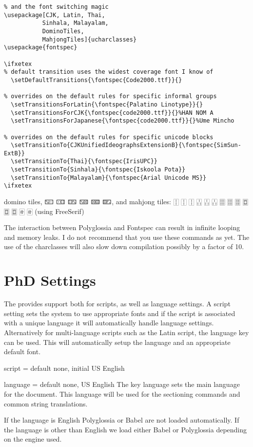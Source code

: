 \begin{verbatim}
% and the font switching magic
\usepackage[CJK, Latin, Thai, 
           Sinhala, Malayalam, 
           DominoTiles, 
           MahjongTiles]{ucharclasses}
\usepackage{fontspec}

\ifxetex
% default transition uses the widest coverage font I know of
  \setDefaultTransitions{\fontspec{Code2000.ttf}}{}

% overrides on the default rules for specific informal groups
  \setTransitionsForLatin{\fontspec{Palatino Linotype}}{}
  \setTransitionsForCJK{\fontspec{code2000.ttf}}{}%HAN NOM A
  \setTransitionsForJapanese{\fontspec{code2000.ttf}}{}%Ume Mincho

% overrides on the default rules for specific unicode blocks
  \setTransitionTo{CJKUnifiedIdeographsExtensionB}{\fontspec{SimSun-ExtB}}
  \setTransitionTo{Thai}{\fontspec{IrisUPC}}
  \setTransitionTo{Sinhala}{\fontspec{Iskoola Pota}}
  \setTransitionTo{Malayalam}{\fontspec{Arial Unicode MS}}
\ifxetex
\end{verbatim}

{
\newfontfamily{}
\mahjong
domino tiles, 🁇 🀼 🁐 🁋 🁚 🁝, and mahjong tiles: 🀑 🀑 🀑 🀒 🀒 🀒 🀕 🀕 🀕 🀗 🀗 🀗 🀅 🀅 (using FreeSerif)

}

The interaction between Polyglossia and Fontspec can result in infinite looping and memory leaks. I do not recommend that you use these commands as yet. The use of the charclasses will also slow down compilation possibly by a factor of 10.



\section{PhD Settings}

The  provides support both for scripts, as well as language settings. A script setting sets the system to use appropriate fonts and if the script is associated with a unique language it will automatically handle language settings. Alternatively for multi-language scripts such as the Latin script, the language key can be used. This will automatically setup the language and an appropriate default font. 

\begin{docKey}[phd]{script} { = } {default none, initial US English}{}
\end{docKey}

\begin{docKey}{language}{ =}  {default none, US English}
The key language sets the main language for the document. This language will be used for the sectioning commands and common string translations.

If the language is English Polyglossia or Babel are not loaded automatically. If the language is other than English we load either Babel or Polyglossia depending on the engine used.
\end{docKey}


